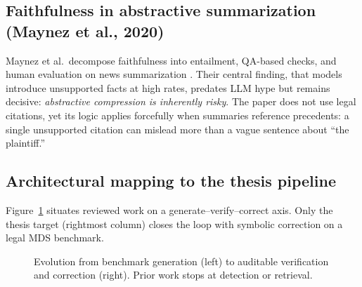 \subsection{Faithfulness in abstractive summarization (Maynez et al., 2020)}

Maynez et al.\ decompose faithfulness into entailment, QA-based checks, and human evaluation on news summarization \cite{maynez2020faithfulness}. Their central finding, that models introduce unsupported facts at high rates, predates LLM hype but remains decisive: \emph{abstractive compression is inherently risky}. The paper does not use legal citations, yet its logic applies forcefully when summaries reference precedents: a single unsupported citation can mislead more than a vague sentence about ``the plaintiff.''

\subsection{Architectural mapping to the thesis pipeline}

Figure~\ref{fig:lit-architecture} situates reviewed work on a generate--verify--correct axis. Only the thesis target (rightmost column) closes the loop with symbolic correction on a legal MDS benchmark.

\begin{figure}[!t]
\centering
{}
\caption{Evolution from benchmark generation (left) to auditable verification and correction (right). Prior work stops at detection or retrieval.}
\label{fig:lit-architecture}
\end{figure}

